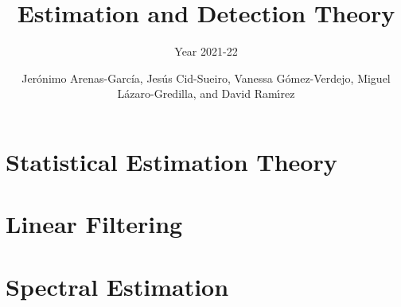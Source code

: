 \documentclass[graybox,envcountchap,sectrefs]{svmono_mod}
\begin{document}
\author{Jer\'onimo Arenas-Garc\'ia, Jes\'us Cid-Sueiro, Vanessa G\'omez-Verdejo, Miguel L\'azaro-Gredilla, and David Ram{\'\i}rez}
\title{Estimation and Detection Theory}
\subtitle{Year 2021-22}
\maketitle

\frontmatter%

%
%
%
%


\tableofcontents
%
\mainmatter%

%


\dominitoc

%
\chapter{Statistical Estimation Theory}
\minitoc







\chapter{Linear Filtering}
\minitoc
\label{cha:FiltradoLinea}


\chapter{Spectral Estimation}
\minitoc

\end{document}

